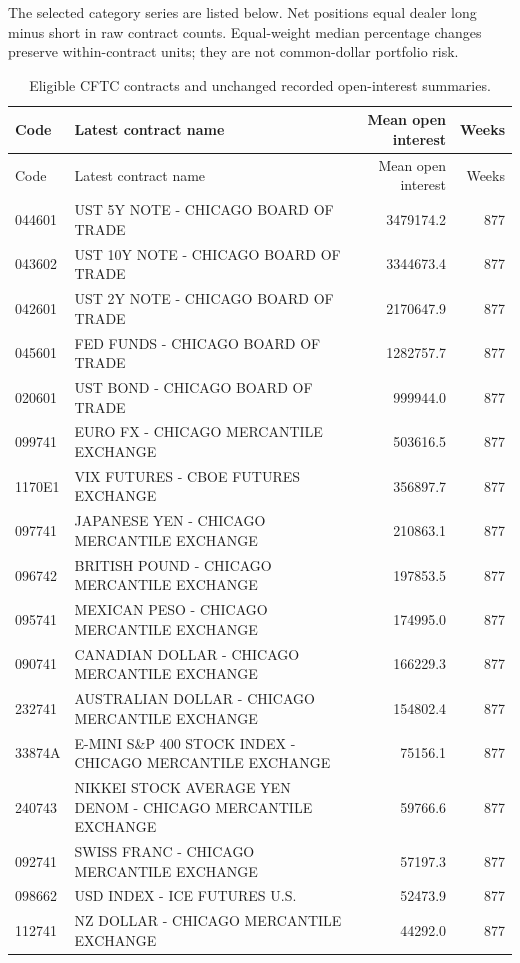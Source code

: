 \documentclass[12pt,a4paper]{article}
\begin{document}
The selected category series are listed below. Net positions equal dealer long minus short in raw contract counts. Equal-weight median percentage changes preserve within-contract units; they are not common-dollar portfolio risk.
\begin{center}\scriptsize\begin{longtable}{lp{7.1cm}rr}
\caption{Eligible CFTC contracts and unchanged recorded open-interest summaries.}\label{tab:cftc-source-inventory}\\
\toprule Code & Latest contract name & Mean open interest & Weeks \\\midrule\endfirsthead
\toprule Code & Latest contract name & Mean open interest & Weeks \\\midrule\endhead
044601 & UST 5Y NOTE - CHICAGO BOARD OF TRADE & 3479174.2 & 877 \\
043602 & UST 10Y NOTE - CHICAGO BOARD OF TRADE & 3344673.4 & 877 \\
042601 & UST 2Y NOTE - CHICAGO BOARD OF TRADE & 2170647.9 & 877 \\
045601 & FED FUNDS - CHICAGO BOARD OF TRADE & 1282757.7 & 877 \\
020601 & UST BOND - CHICAGO BOARD OF TRADE & 999944.0 & 877 \\
099741 & EURO FX - CHICAGO MERCANTILE EXCHANGE & 503616.5 & 877 \\
1170E1 & VIX FUTURES - CBOE FUTURES EXCHANGE & 356897.7 & 877 \\
097741 & JAPANESE YEN - CHICAGO MERCANTILE EXCHANGE & 210863.1 & 877 \\
096742 & BRITISH POUND - CHICAGO MERCANTILE EXCHANGE & 197853.5 & 877 \\
095741 & MEXICAN PESO - CHICAGO MERCANTILE EXCHANGE & 174995.0 & 877 \\
090741 & CANADIAN DOLLAR - CHICAGO MERCANTILE EXCHANGE & 166229.3 & 877 \\
232741 & AUSTRALIAN DOLLAR - CHICAGO MERCANTILE EXCHANGE & 154802.4 & 877 \\
33874A & E-MINI S\&P 400 STOCK INDEX - CHICAGO MERCANTILE EXCHANGE & 75156.1 & 877 \\
240743 & NIKKEI STOCK AVERAGE YEN DENOM - CHICAGO MERCANTILE EXCHANGE & 59766.6 & 877 \\
092741 & SWISS FRANC - CHICAGO MERCANTILE EXCHANGE & 57197.3 & 877 \\
098662 & USD INDEX - ICE FUTURES U.S. & 52473.9 & 877 \\
112741 & NZ DOLLAR - CHICAGO MERCANTILE EXCHANGE & 44292.0 & 877 \\
\bottomrule\end{longtable}\end{center}
\end{document}
